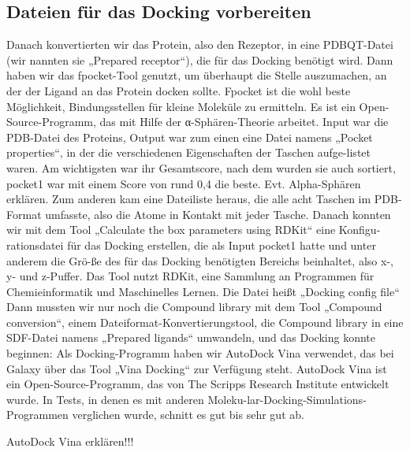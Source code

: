 \documentclass[11pt]{article}
\begin{document}
    \subsection{Dateien für das Docking vorbereiten}\label{subsec:dateien-für-das-docking-vorbereiten}

    Danach konvertierten wir das Protein, also den Rezeptor, in eine PDBQT-Datei (wir nannten sie „Prepared receptor“), die für das Docking benötigt wird.
    Dann haben wir das fpocket-Tool genutzt, um überhaupt die Stelle auszumachen, an der der Ligand an das Protein docken sollte. Fpocket ist die wohl beste Möglichkeit, Bindungsstellen für kleine Moleküle zu ermitteln. Es ist ein Open-Source-Programm, das mit Hilfe der α-Sphären-Theorie arbeitet. Input war die PDB-Datei des Proteins, Output war zum einen eine Datei namens „Pocket properties“, in der die verschiedenen Eigenschaften der Taschen aufge-listet waren. Am wichtigsten war ihr Gesamtscore, nach dem wurden sie auch sortiert, pocket1 war mit einem Score von rund 0,4 die beste.
    Evt. Alpha-Sphären erklären.
    Zum anderen kam eine Dateiliste heraus, die alle acht Taschen im PDB-Format umfasste, also die Atome in Kontakt mit jeder Tasche.
    Danach konnten wir mit dem Tool „Calculate the box parameters using RDKit“ eine Konfigu-rationsdatei für das Docking erstellen, die als Input pocket1 hatte und unter anderem die Grö-ße des für das Docking benötigten Bereichs beinhaltet, also x-, y- und z-Puffer. Das Tool nutzt RDKit, eine Sammlung an Programmen für Chemieinformatik und Maschinelles Lernen. Die Datei heißt „Docking config file“
    Dann mussten wir nur noch die Compound library mit dem Tool „Compound conversion“, einem Dateiformat-Konvertierungstool, die Compound library in eine SDF-Datei namens „Prepared ligands“ umwandeln, und das Docking konnte beginnen:
    Als Docking-Programm haben wir AutoDock Vina verwendet, das bei Galaxy über das Tool „Vina Docking“ zur Verfügung steht. AutoDock Vina ist ein Open-Source-Programm, das von The Scripps Research Institute entwickelt wurde. In Tests, in denen es mit anderen Moleku-lar-Docking-Simulations-Programmen verglichen wurde, schnitt es gut bis sehr gut ab.

    AutoDock Vina erklären!!!
\end{document}
